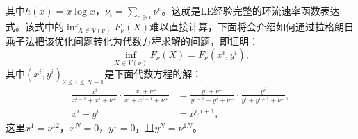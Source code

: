 其中$h(x) = x \log x$，$\nu_i=\sum_{c\ni i}\nu^c$。这就是LE经验完整的环流速率函数表达式。该式中的$\inf_{X\in V(\nu)}F_{\nu}(X)$难以直接计算，下面将会介绍如何通过拉格朗日乘子法把该优化问题转化为代数方程求解的问题，即证明：
\begin{equation*}
    \inf_{X\in V(\nu)}F_{\nu}(X) = F_{\nu}(x^i,y^i),
\end{equation*}
其中$(x^i,y^i)_{2\leq i\leq N-1}$是下面代数方程的解：
\begin{equation}\label{equation}
    \begin{split}
    \frac{x^{i}}{x^{i-1}+x^{i}+\nu^+}\cdot\frac{x^{i}+\nu^+}{x^{i}+x^{i+1}+\nu^+}
    &= \frac{y^{i}+\nu^-}{y^{i-1}+y^{i}+\nu^-}\cdot\frac{y^{i}}{y^{i}+y^{i+1}+\nu^-},\\
    x^{i} + y^{i} &= \nu^{i,i+1},
    \end{split}
\end{equation}
这里$x^1=\nu^{12}$，$x^N=0$，$y^1=0$，且$y^N=\nu^{1N}$。


